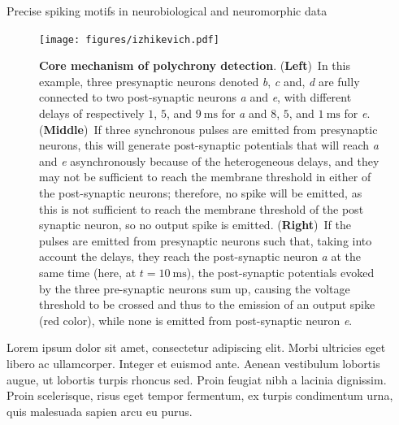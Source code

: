 \documentclass[final]{beamer}
\newcommand{\ms}{\si{\milli\second}}%
\newlength{\colwidth}
\begin{document}
\begin{frame}[t]
\begin{columns}[t]
\begin{column}{\colwidth}
\begin{block}{Precise spiking motifs in neurobiological and neuromorphic data~\parencite{Grimaldi22polychronies}}
    \begin{figure}[H]%
        \texttt{[image: figures/izhikevich.pdf]}%
          \caption{\textbf{Core mechanism of polychrony detection}. {(\textbf{Left})}~In this example, three presynaptic neurons denoted \textit{b}, \textit{c} and, \textit{d} are fully connected to two post-synaptic neurons \textit{a} and \textit{e}, with different delays of respectively $1$, $5$, and $9~\ms$ for \textit{a} and  $8$, $5$, and $1~\ms$ for \textit{e}. {(\textbf{Middle})}~If three synchronous pulses are emitted from presynaptic neurons, this will generate post-synaptic potentials that will reach \textit{a} and \textit{e} asynchronously because of the heterogeneous delays, and they may not be sufficient to reach the membrane threshold in either of the post-synaptic neurons; therefore, no spike will be emitted, as this is not sufficient to reach the membrane threshold of the post synaptic neuron, so no output spike is emitted.
          {(\textbf{Right})}~If the pulses are emitted from presynaptic neurons such that, taking into account the delays, they reach the post-synaptic neuron \textit{a} at the same time (here, at $t=10~\ms$),  the post-synaptic potentials evoked by the three pre-synaptic neurons sum up, causing the voltage threshold to be crossed and thus to the emission of an output spike (red color), while none is emitted from post-synaptic neuron \textit{e}.
           }
        \label{fig:izhikevich}
      \end{figure}

    Lorem ipsum dolor sit amet, consectetur adipiscing elit. Morbi ultricies
    eget libero ac ullamcorper. Integer et euismod ante. Aenean vestibulum
    lobortis augue, ut lobortis turpis rhoncus sed. Proin feugiat nibh a
    lacinia dignissim. Proin scelerisque, risus eget tempor fermentum, ex
    turpis condimentum urna, quis malesuada sapien arcu eu purus.

  \end{block}


\end{column}
\end{columns}
\end{frame}
\end{document}
